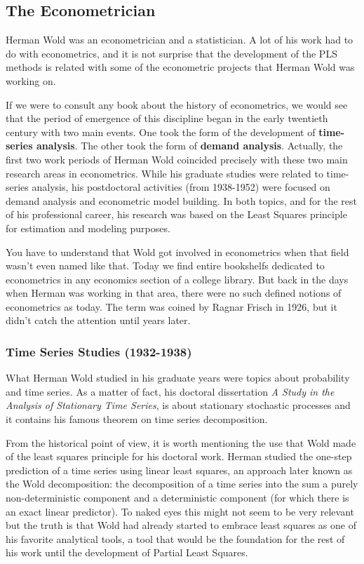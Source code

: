\documentclass[12pt]{book}\usepackage{graphicx, color}
\begin{document}
\subsection{The Econometrician}
Herman Wold was an econometrician and a statistician. A lot of his work had to do with econometrics, and it is not surprise that the development of the PLS methods is related with some of the econometric projects that Herman Wold was working on. 

If we were to consult any book about the history of econometrics, we would see that the period of emergence of this discipline began in the early twentieth century with two main events. One took the form of the development of \textbf{time-series analysis}. The other took the form of \textbf{demand analysis}. Actually, the first two work periods of Herman Wold coincided precisely with these two main research areas in econometrics. While his graduate studies were related to time-series analysis, his postdoctoral activities (from 1938-1952) were focused on demand analysis and econometric model building. In both topics, and for the rest of his professional career, his research was based on the Least Squares principle for estimation and modeling purposes.

You have to understand that Wold got involved in econometrics when that field wasn't even named like that. Today we find entire bookshelfs dedicated to econometrics in any economics section of a college library. But back in the days when Herman was working in that area, there were no such defined notions of econometrics as today. The term was coined by Ragnar Frisch in 1926, but it didn't catch the attention until years later. 


\subsubsection*{Time Series Studies (1932-1938)}
What Herman Wold studied in his graduate years were topics about probability and time series. As a matter of fact, his doctoral dissertation \textit{A Study in the Analysis of Stationary Time Series}, is about stationary stochastic processes and it contains his famous theorem on time series decomposition.

From the historical point of view, it is worth mentioning the use that Wold made of the least squares principle for his doctoral work. Herman studied the one-step prediction of a time series using linear least squares, an approach later known as the Wold decomposition: the decomposition of a time series into the sum a purely non-deterministic component and a deterministic component (for which there is an exact linear predictor). To naked eyes this might not seem to be very relevant but the truth is that Wold had already started to embrace least squares as one of his favorite analytical tools, a tool that would be the foundation for the rest of his work until the development of Partial Least Squares. 
\end{document}
